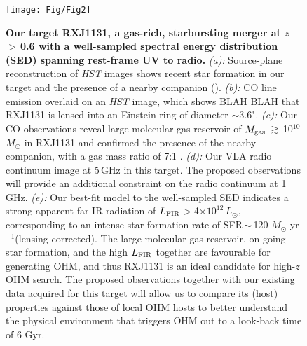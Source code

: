 \documentclass[letterpaper,11pt]{article}
\newcommand{\Lsun}{\mbox{$L_{\odot}$}\xspace}
\newcommand{\Msun}{\mbox{$M_{\odot}$}\xspace}
\newcommand{\LFIR}{\mbox{$L_{\rm FIR}$}\xspace}
\newcommand{\pmOne}{\mbox{$^{-1}$}\xspace}
\newcommand{\E}[1]{\mbox{$\times10^{#1}$}}
\newcommand{\ssim}{\,$\sim$\,}
\newcommand{\obs}{observations\xspace}
\begin{document}
\begin{figure}[ptbh]
\centering
\texttt{[image: Fig/Fig2]} 
\vspace{-0.25em}
\caption{
{\bf Our target RXJ1131, a gas-rich, starbursting merger at $z$\,$>$\,0.6 with a well-sampled spectral energy distribution (SED) spanning rest-frame UV to radio.} 
{\em (a):} Source-plane reconstruction of {\it HST} images shows recent star formation in our target and
the presence of a nearby companion (\citealt{Claeskens06a}).
{\em (b):} 
CO line emission overlaid on an {\it HST} image, which shows BLAH BLAH
that RXJ1131 is lensed into an Einstein ring of diameter $\sim$3.6".
{\em (c):}
Our CO \obs reveal large molecular gas reservoir of $M_{\rm gas}$\,$\gtrsim$\,10$^{10}$\Msun in RXJ1131 and 
confirmed the presence of the nearby companion, with a gas mass ratio of 7:1 \citep{Leung17a}. 
{\em (d):}
Our VLA radio continuum image at 5\,GHz in this target. 
The proposed \obs will provide an additional constraint on the radio continuum at 1\,GHz.
{\em (e):} Our best-fit model to the well-sampled SED 
indicates a strong apparent far-IR radiation of \LFIR$>$4\E{12}\,\Lsun, corresponding to
an intense star formation rate of SFR\ssim120 \Msun yr\pmOne (lensing-corrected).
The large molecular gas reservoir, on-going star formation, and the high \LFIR together
are favourable for generating OHM, and thus RXJ1131 is an
ideal candidate for high-$z$ OHM search.
The proposed \obs together with our existing data acquired for this target will allow us to 
compare its (host) properties against those of local OHM hosts to better understand 
the physical environment that triggers OHM out to a look-back time of 6 Gyr.
\label{fig:hst}}
\end{figure}
\end{document}
